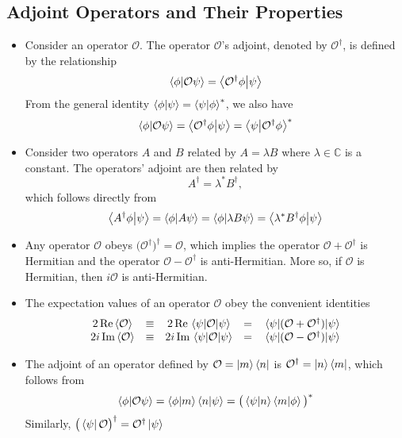 \documentclass[11pt, a4paper]{article}
\newcommand{\Herm}{Hermitian\xspace}
\renewcommand{\O}{\mathcal{O}}  %
\newcommand{\p}{\psi}  %
\newcommand{\bbraket}[2]{\big \langle {#1} \big | {#2} \big \rangle}  %
\begin{document}
\subsection{Adjoint Operators and Their Properties}
\begin{itemize}
	\item Consider an operator $ \O $. The operator $ \O $'s adjoint, denoted by $ \O^{\dagger} $, is defined by the relationship
	\begin{equation*}
		\braket{\phi}{\O \p} = \bbraket{\O^{\dagger}\phi}{\p}
	\end{equation*}
	From the general identity $ \braket{\phi}{\psi} = \braket{\psi}{\phi}^{*} $, we also have
	\begin{equation*}
		\braket{\phi}{\O \p} = \bbraket{\O^{\dagger}\phi}{\p} = \bbraket{\p}{\O^{\dagger}\phi}^{*}
	\end{equation*}
	
	\item Consider two operators $ A $ and $ B $ related by $ A = \lambda B $ where $ \lambda \in \mathbb{C} $ is a constant. The operators' adjoint are then related by
	\begin{equation*}
		A^{\dagger} = \lambda^{*}B^{\dagger},
	\end{equation*}
	which follows directly from
	\begin{equation*}
		\bbraket{A^{\dagger}\phi}{\p} = \braket{\phi}{A \p} = \braket{\phi}{\lambda B \p} = \bbraket{\lambda^{*}B^{\dagger}\phi}{\p}
	\end{equation*}
	
	\item Any operator $ \O $ obeys $ \big(\O^{\dagger}\big)^{\dagger} = \O $, which implies the operator  $ \O + \O^{\dagger} $ is \Herm and the operator $ \O - \O^{\dagger} $ is anti-\Herm.  More so, if $ \O $ is \Herm, then $ i\O $ is anti-\Herm.
	
	\item The expectation values of an operator $ \O $ obey the convenient identities
	\begin{equation*}
	\begin{array}{ccccc}
		2 \Re \ev{\O} & \equiv & 2 \Re \mel{\p}{\O}{\p} & = & \mel{\p}{(\O + \O^{\dag})}{\p}\\
		2i \Im \ev{\O} & \equiv & 2i \Im \mel{\p}{\O}{\p} & = & \mel{\p}{(\O - \O^{\dag})}{\p}
	\end{array}
	\end{equation*}
	
	\item The adjoint of an operator defined by $ \O = \ket{m}\bra{n} $ is $ \O^{\dagger} = \ket{n} \bra{m} $, which follows from
	\begin{equation*}
		\braket{\phi}{\O \p} = \braket{\phi}{m}\braket{n}{\p} = \big(\bra{\p} \ket{n} \bra{m} \ket{\phi} \big)^{*}
	\end{equation*}
	Similarly, $ \big(\bra{\p}\O\big)^{\dagger} = \O^{\dagger}\ket{\p} $
	

\end{itemize}
\end{document}
